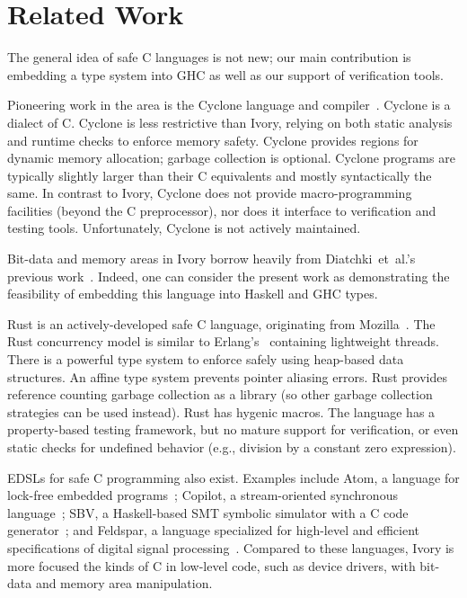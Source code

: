 \section{Related Work}
\label{sec:related-work}



The general idea of safe C languages is not new; our main contribution is
embedding a type system into GHC as well as our support of verification
tools.

Pioneering work in the area is the Cyclone language and
compiler~\cite{cyclone}. Cyclone is a dialect of C. Cyclone is less restrictive than
Ivory, relying on both static analysis and runtime checks to enforce memory
safety. Cyclone provides regions for dynamic memory allocation; garbage
collection is optional. Cyclone programs are typically slightly larger than
their C equivalents and mostly syntactically the same. In contrast to Ivory,
Cyclone does not provide macro-programming facilities (beyond the C
preprocessor), nor does it interface to verification and testing
tools. Unfortunately, Cyclone is not actively maintained.

Bit-data and memory areas in Ivory borrow heavily from Diatchki~et~al.'s
previous work~\cite{high-level, memareas}. Indeed, one can consider the present
work as demonstrating the feasibility of embedding this language into Haskell
and GHC types.

Rust is an actively-developed safe C language, originating from
Mozilla~\cite{rust}. The Rust concurrency model is similar to Erlang's~\cite{}
containing lightweight threads. There is a powerful type system to enforce
safely using heap-based data structures. An affine type system prevents pointer
aliasing errors. Rust provides reference counting garbage collection as a
library (so other garbage collection strategies can be used instead). Rust has
hygenic macros. The language has a property-based testing framework, but no
mature support for verification, or even static checks for undefined behavior
(e.g., division by a constant zero expression).

EDSLs for safe C programming also exist. Examples include Atom, a language for
lock-free embedded programs~\cite{atom}; Copilot, a stream-oriented synchronous
language~\cite{copilot}; SBV, a Haskell-based SMT symbolic simulator with a C code
generator~\cite{sbv}; and Feldspar, a language specialized for high-level and
efficient specifications of digital signal processing~\cite{feldspar1}. Compared to these
languages, Ivory is more focused the kinds of C in low-level code, such as
device drivers, with bit-data and memory area manipulation.
